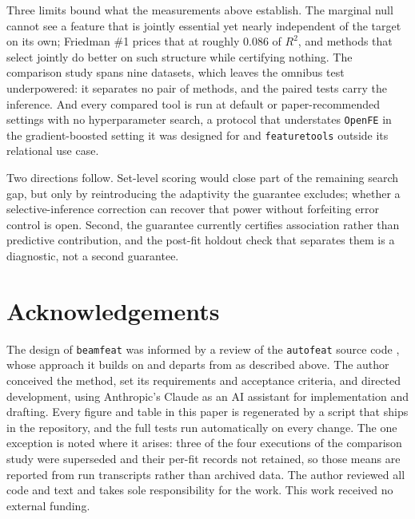 \documentclass[
]{article}
\begin{document}
Three limits bound what the measurements above establish. The marginal null
cannot see a feature that is jointly essential yet nearly independent of the
target on its own; Friedman \#1 prices that at roughly 0.086 of $R^2$, and
methods that select jointly do better on such structure while certifying
nothing. The comparison study spans nine datasets, which leaves the omnibus
test underpowered: it separates no pair of methods, and the paired tests carry
the inference. And every compared tool is run at default or paper-recommended
settings with no hyperparameter search, a protocol that understates
\texttt{OpenFE} in the gradient-boosted setting it was designed for and
\texttt{featuretools} outside its relational use case.

Two directions follow. Set-level scoring would close part of the remaining
search gap, but only by reintroducing the adaptivity the guarantee excludes;
whether a selective-inference correction can recover that power without
forfeiting error control is open. Second, the guarantee currently certifies
association rather than predictive contribution, and the post-fit holdout check
that separates them is a diagnostic, not a second guarantee.

\hypertarget{acknowledgements}{%
\section{Acknowledgements}\label{acknowledgements}}

The design of \texttt{beamfeat} was informed by a review of the
\texttt{autofeat} source code \citep{horn2019}, whose approach it builds
on and departs from as described above. The author conceived the method,
set its requirements and acceptance criteria, and directed development, using Anthropic's Claude as an AI assistant for implementation and drafting. Every figure and table in
this paper is regenerated by a script that ships in the repository, and
the full tests run automatically on every change. The one exception is
noted where it arises: three of the four executions of the comparison
study were superseded and their per-fit records not retained, so those
means are reported from run transcripts rather than archived data. The
author reviewed all code and text and takes sole responsibility for the
work. This work received no external funding.

\renewcommand\refname{References}
  
\end{document}
